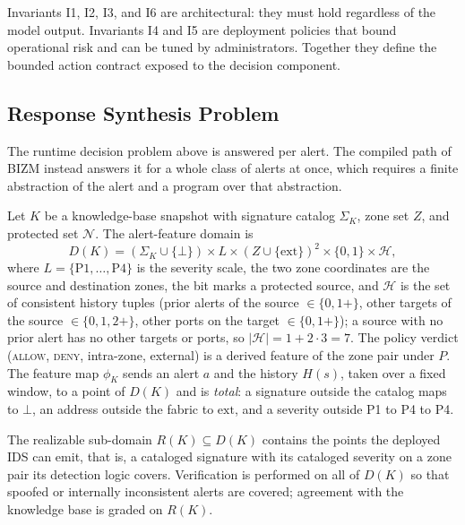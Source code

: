 \documentclass[final,5p]{elsarticle}
\begin{document}
Invariants I1, I2, I3, and I6 are architectural: they must hold regardless of the model output. Invariants I4 and I5 are deployment policies that bound operational risk and can be tuned by administrators. Together they define the bounded action contract exposed to the decision component.

\subsection{Response Synthesis Problem}
\label{sec:synthesis_problem}

The runtime decision problem above is answered per alert. The compiled path of BIZM instead answers it for a whole class of alerts at once, which requires a finite abstraction of the alert and a program over that abstraction.

\begin{definition}\label{def:features}
Let $K$ be a knowledge-base snapshot with signature catalog $\Sigma_K$, zone set $Z$, and protected set $\mathcal{N}$. The alert-feature domain is
\[
D(K) = (\Sigma_K \cup \{\bot\}) \times L \times (Z\cup\{\mathrm{ext}\})^2 \times \{0,1\} \times \mathcal{H},
\]
where $L=\{\text{P1},\ldots,\text{P4}\}$ is the severity scale, the two zone coordinates are the source and destination zones, the bit marks a protected source, and $\mathcal{H}$ is the set of consistent history tuples (prior alerts of the source $\in\{0,1{+}\}$, other targets of the source $\in\{0,1,2{+}\}$, other ports on the target $\in\{0,1{+}\}$); a source with no prior alert has no other targets or ports, so $|\mathcal{H}|=1+2\cdot 3=7$. The policy verdict (\textsc{allow}, \textsc{deny}, intra-zone, external) is a derived feature of the zone pair under $P$. The feature map $\phi_K$ sends an alert $a$ and the history $H(s)$, taken over a fixed window, to a point of $D(K)$ and is \emph{total}: a signature outside the catalog maps to $\bot$, an address outside the fabric to $\mathrm{ext}$, and a severity outside P1 to P4 to P4.
\end{definition}

The realizable sub-domain $R(K)\subseteq D(K)$ contains the points the deployed IDS can emit, that is, a cataloged signature with its cataloged severity on a zone pair its detection logic covers. Verification is performed on all of $D(K)$ so that spoofed or internally inconsistent alerts are covered; agreement with the knowledge base is graded on $R(K)$.
\end{document}
